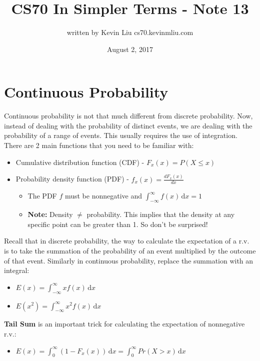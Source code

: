 \documentclass[a4paper]{article}
\title{CS70 In Simpler Terms - Note 13}
\author{written by Kevin Liu cs70.kevinmliu.com}
\date{August 2, 2017}
\begin{document}
\maketitle

\section{Continuous Probability}
Continuous probability is not that much different from discrete probability. Now, instead of dealing with the probability of distinct events, we are dealing with the probability of a range of events. This usually requires the use of integration.\\

There are 2 main functions that you need to be familiar with:
\begin{itemize}
    \item Cumulative distribution function (CDF) - $F_x(x) = P(X \leq x)$
    \item Probability density function (PDF) - $f_x(x) = \frac{dF_x(x)}{dx}$
    \begin{itemize}
        \item The PDF $f$ must be nonnegative and $\int_{-\infty}^\infty f(x) \, {\mathrm{d}}x = 1$
        \item \textbf{Note:} Density $\neq$ probability. This implies that the density at any specific point can be greater than 1. So don't be surprised!
    \end{itemize}
\end{itemize}
Recall that in discrete probability, the way to calculate the expectation of a r.v. is to take the summation of the probability of an event multiplied by the outcome of that event. Similarly in continuous probability, replace the summation with an integral:
\begin{itemize}
    \item $E(x) = \int_{-\infty}^\infty xf(x) \, {\mathrm{d}}x$
    \item $E(x^2) = \int_{-\infty}^\infty x^2f(x) \, {\mathrm{d}}x$
\end{itemize}
\textbf{Tail Sum} is an important trick for calculating the expectation of nonnegative r.v.:
\begin{itemize}
    \item $E(x) = \int_{0}^\infty (1-F_x(x)) \, {\mathrm{d}}x = \int_{0}^\infty Pr(X >x) \, {\mathrm{d}}x$
\end{itemize}
\end{document}
